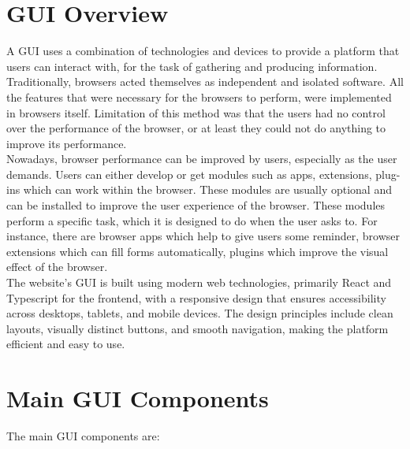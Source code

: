 \documentclass[11pt]{report}
\begin{document}
\section{GUI Overview}
A GUI uses a combination of technologies and devices to provide a platform that users can interact with, for the task of gathering and producing information. Traditionally, browsers acted themselves as independent and isolated software. All the features that were necessary for the browsers to perform, were implemented in browsers itself. Limitation of this method was that the users had no control over the performance of the browser, or at least they could not do anything to improve its performance. \\

Nowadays, browser performance can be improved by users, especially as the user demands. Users can either develop or get modules such as apps, extensions, plug-ins which can work within the browser. These modules are usually optional and can be installed to improve the user experience of the browser. These modules perform a specific task, which it is designed to do when the user asks to. For instance, there are browser apps which help to give users some reminder, browser extensions which can fill forms automatically, plugins which improve the visual effect of the browser. \\

The website’s GUI is built using modern web technologies, primarily React and Typescript for the frontend, with a responsive design that ensures accessibility across desktops, tablets, and mobile devices. The design principles include clean layouts, visually distinct buttons, and smooth navigation, making the platform efficient and easy to use. 

\section{Main GUI Components}
The main GUI components are:
\end{document}
